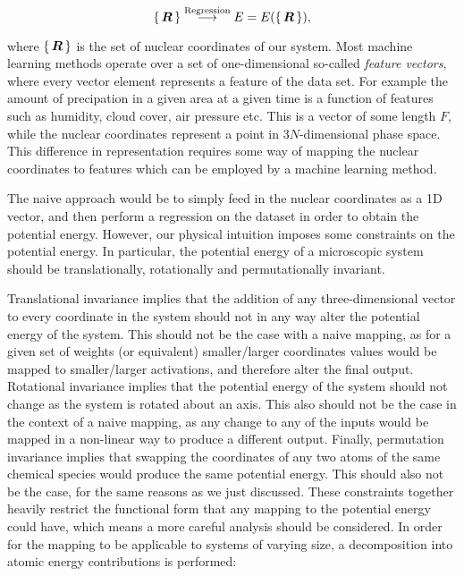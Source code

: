 $$ \set{\bm{R}} \overset{\text{Regression}}{\longrightarrow}
    E = E(\set{\bm{R}}) , $$

where $\set{\bm{R}}$ is the set of nuclear coordinates of our system.
Most machine learning methods operate over a set of one-dimensional
so-called \textit{feature vectors}, where every vector element
represents a feature of the data set. For example the amount
of precipation in a given area at a given time is a function
of features such as humidity, cloud cover, air pressure etc.
This is a vector of some length $F$, while the nuclear coordinates
represent a point in $3N$-dimensional phase space.
This difference in representation requires some way of mapping
the nuclear coordinates to features which can be employed
by a machine learning method.
\par
The naive approach would be to simply feed in the nuclear coordinates
as a 1D vector, and then perform a regression on the dataset
in order to obtain the potential energy. However, our physical intuition
imposes some constraints on the potential energy.
In particular, the potential energy of a microscopic system should
be translationally, rotationally and permutationally invariant.
\par
Translational invariance implies that the addition of any
three-dimensional vector to every coordinate in the system should
not in any way alter the potential energy of the system.
This should not be the case with a naive mapping, as for a given
set of weights (or equivalent) smaller/larger coordinates
values would be mapped to smaller/larger activations, and therefore
alter the final output.
Rotational invariance implies that the potential energy
of the system should not change as the system is rotated
about an axis. This also should not be the case in the context
of a naive mapping, as any change to any of the inputs
would be mapped in a non-linear way to produce a different output.
Finally, permutation invariance implies that swapping the coordinates
of any two atoms of the same chemical species would produce the
same potential energy. This should also not be the case, for
the same reasons as we just discussed.
These constraints together heavily restrict the functional form
that any mapping to the potential energy could have,
which means a more careful analysis should be considered.
\newline
\newline
In order for the mapping to be applicable to systems of varying size,
a decomposition into atomic energy contributions is performed:

